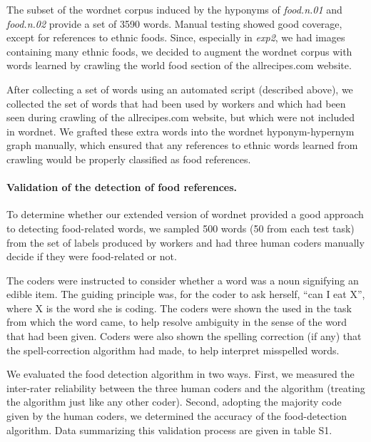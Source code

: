 \documentclass[12pt]{article}
\begin{document}
The subset of the wordnet corpus induced by the hyponyms of \textit{food.n.01}
and \textit{food.n.02} provide a set of 3590 words.  Manual
testing showed good coverage, except for references to ethnic foods.  
Since, especially in \textit{exp2}, we had images containing many ethnic 
foods, we decided to augment the wordnet corpus with words learned by 
crawling the world food section of the allrecipes.com website.  

After collecting a set of words using an automated script 
(described above), we collected the set of words that had been used by
workers and which had been seen during crawling of the allrecipes.com website,
but which were not included in wordnet.  We grafted these extra words into
the wordnet hyponym-hypernym graph manually, which ensured that any references
to ethnic words learned from crawling would be properly classified as 
food references.

\paragraph{Validation of the detection of food references.}
To determine whether our extended version of wordnet provided a good approach
to detecting food-related words, we sampled 500 words 
(50 from each test task)  from the set of labels produced by workers and had 
three human coders manually decide if they were 
food-related or not.

The coders were instructed to consider whether a word was a noun signifying
an edible item.  The guiding principle was, for the coder to ask herself,
``can I eat X'', where X is the word she is coding.  The coders were
shown the used in the task from which the word came, to help resolve ambiguity
in the sense of the word that had been given.  Coders were also shown the 
spelling correction (if any) that the spell-correction algorithm had made,
to help interpret misspelled words.

We evaluated the food detection algorithm in two ways.  First, we measured
the inter-rater reliability between the three human coders and the algorithm
(treating the algorithm just like any other coder).  Second, adopting the 
majority code given by the human coders, we determined the accuracy of the
food-detection algorithm.  Data summarizing this validation process are given
in table S1.
\end{document}
